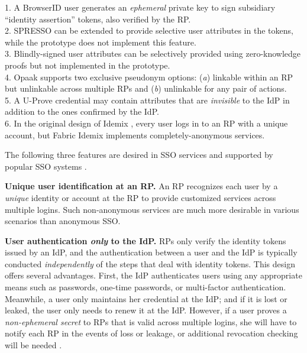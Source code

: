 \begin{table}[tb]
\begin{tabular}{|c|c|c|c|c|c|c|}
\end{tabular}
    \label{tbl:comparison-protocol}
\flushleft
{\footnotesize
1. A BrowserID user generates an \emph{ephemeral} private key to sign subsidiary ``identity assertion'' tokens,
also verified by the RP.\\
2. SPRESSO can be extended to provide selective user attributes in the tokens, while the prototype does not implement this feature.\\
3. Blindly-signed user attributes can be selectively provided using zero-knowledge proofs but not implemented in the prototype.\\
4. Opaak supports two exclusive pseudonym options: (\emph{a}) linkable within an RP but unlinkable across multiple RPs and (\emph{b}) unlinkable for any pair of actions.\\
5. A U-Prove credential may contain attributes that are \emph{invisible} to the IdP in addition to the ones confirmed by the IdP. \\
6. In the original design of Idemix \cite{idemix}, every user logs in to an RP with a unique account, but Fabric Idemix implements completely-anonymous services.
}
\end{table}

The following three features are desired in SSO services and supported by popular SSO systems \cite{NIST2017draft, OpenIDConnect,rfc6749, SAML, SAMLIdentifier}.

\noindent \textbf{Unique user identification at an RP.}
An RP recognizes each user by a \emph{unique} identity or account at the RP to provide customized services across multiple logins.
Such non-anonymous services are much more desirable in various scenarios than anonymous SSO.

\noindent\textbf{User authentication {\em only} to the IdP.}
RPs only verify the identity tokens issued by an IdP, and the authentication between a user and the IdP is typically conducted \emph{independently} of the steps that deal with identity tokens.
This design offers several advantages. First, the IdP authenticates users using any appropriate means such as passwords, one-time passwords, or multi-factor authentication.
Meanwhile, a user only maintains her credential at the IdP; and if it is lost or leaked, the user only needs to renew it at the IdP.
However, if a user proves a \emph{non-ephemeral secret} to RPs that is valid across multiple logins, she will have to notify each RP in the events of loss or leakage, or additional revocation checking will be needed \cite{ELPASSO, UnlimitID}.

